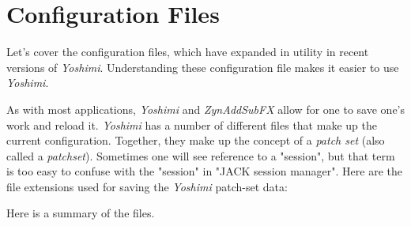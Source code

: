 %
%
%

\section{Configuration Files}
\label{sec:configuration}

   Let's cover the configuration files, which have expanded in utility in
   recent versions of \textsl{Yoshimi}.
   Understanding these configuration file makes it easier to 
   use \textsl{Yoshimi}.

   As with most applications, \textsl{Yoshimi} and \textsl{ZynAddSubFX}
   allow for one to save one's work and reload it.
   \textsl{Yoshimi} has a number of different files that make up the current
   configuration.
   Together, they make up the concept of a \textsl{patch set} (also called a
   \textsl{patchset}).
   Sometimes one will see reference to a "session", but that term is too easy
   to confuse with the "session" in "JACK session manager".
   Here are the file extensions used for saving the \textsl{Yoshimi}
   patch-set data:

   Here is a summary of the files.

